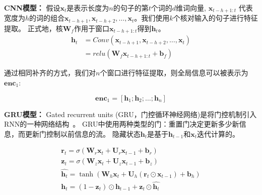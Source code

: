 \textbf{CNN模型： } 假设$\mathbf{x}_t$是表示长度为${n}$的句子的第$t$个词的$d$维词向量, $\mathbf{x}_{t-h+1:t}$ 代表宽度为$h$的词的组合$\mathbf{x}_{t-h+1}, \mathbf{x}_{t-h+2}, \ldots, \mathbf{x}_{t}$。我们使用$k$个核对输入的句子进行特征提取。
正式地，核$\mathbf{W}_f$作用于窗口$\mathbf{x}_{t-h+1:t}$得到$\mathbf{h}_{t}$。
\begin{align}
\mathbf{h}_{t} &= Conv(\mathbf{x}_{t-h+1}, \mathbf{x}_{t-h+2}, \ldots, \mathbf{x}_{t}) \label{equ: conv}\\
			   &= relu(\mathbf{W}_f \mathbf{x}_{t-h+1:t} + \mathbf{b}_f)
\end{align}

通过相同补齐的方式，我们对$n$个窗口进行特征提取，则全局信息可以被表示为$\mathbf{enc}_1$:

\begin{equation}
\mathbf{enc}_1 = [\mathbf{h}_{1}; \mathbf{h}_{2}; \ldots; \mathbf{h}_{n}]
\end{equation}

\textbf{GRU模型： } Gated recurrent units (GRU，门控循环神经网络)是将门控机制引入RNN的一种网络结构~\citep{cho2014learning}。
GRU中使用两种类型的门：重置门决定更新多少新信息，而更新门控制以前信息的流。
隐藏状态$\mathbf{h}_{t}$是基于$\mathbf{h}_{t-1}$和$\mathbf{x}_{t}$迭代计算的。

\begin{gather}
\label{equ: gru1}
\mathbf{r}_{t} = \sigma(\mathbf{W}_{r} \mathbf{x}_{t} + \mathbf{U}_{r} \mathbf{x}_{t-1} + \mathbf{b}_{r}) \\
\mathbf{z}_{t} = \sigma(\mathbf{W}_{z} \mathbf{x}_{t} + \mathbf{U}_{z} \mathbf{x}_{t-1} + \mathbf{b}_{z}) \\
\hat{\mathbf{h}_{t}} = \tanh(\mathbf{W}_{h} \mathbf{x}_{t} + \mathbf{U}_{h} (\mathbf{r}_{t} \odot \mathbf{x}_{t-1}) + \mathbf{b}_{h}) \\
\mathbf{h}_{t} = (1 - \mathbf{z}_{t}) \odot \mathbf{h}_{t-1} + \mathbf{z}_{t} \odot \hat{\mathbf{h}_{t}}
\label{equ: gru2}
\end{gather}

